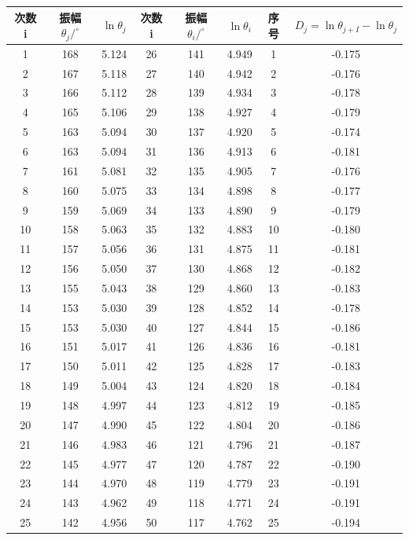 \documentclass[UTF8]{ctexart}
\begin{document}
\begin{center}
    \begin{tabular}{|c|c|c|c|c|c|c|c|}
        \hline   次数  i &  振幅  $\theta_{j} /^{\circ}$ & $\ln \theta_{j} $&  次数  i &  振幅  $\theta_{i} /^{\circ}$ & $\ln \theta_{i}$& 序号& $D_j=\ln \theta_{j+I}-\ln \theta_{j}$ \\
        \hline 1 & 168 & 5.124 & 26 & 141 & 4.949 &1     & -0.175  \\
        \hline 2 & 167 & 5.118 & 27 & 140 & 4.942 &2     & -0.176 \\
        \hline 3 & 166 & 5.112 & 28 & 139 & 4.934 &3     & -0.178 \\
        \hline 4 & 165 & 5.106 & 29 & 138 & 4.927 &4     & -0.179 \\
        \hline 5 & 163 & 5.094 & 30 & 137 & 4.920 &5     & -0.174 \\
        \hline 6 & 163 & 5.094 & 31 & 136 & 4.913 &6     & -0.181 \\
        \hline 7 & 161 & 5.081 & 32 & 135 & 4.905 &7     & -0.176 \\
        \hline 8 & 160 & 5.075 & 33 & 134 & 4.898 &8     & -0.177 \\
        \hline 9 & 159 & 5.069 & 34 & 133 & 4.890 &9     & -0.179 \\
        \hline 10 & 158 & 5.063 & 35 & 132 & 4.883 &10   & -0.180 \\
        \hline 11 & 157 & 5.056 & 36 & 131 & 4.875 &11   & -0.181 \\
        \hline 12 & 156 & 5.050 & 37 & 130 & 4.868 &12   & -0.182 \\
        \hline 13 & 155 & 5.043 & 38 & 129 & 4.860 &13   & -0.183 \\
        \hline 14 & 153 & 5.030 & 39 & 128 & 4.852 &14   & -0.178 \\
        \hline 15 & 153 & 5.030 & 40 & 127 & 4.844 &15   & -0.186\\
        \hline 16 & 151 & 5.017 & 41 & 126 & 4.836 &16   & -0.181\\
        \hline 17 & 150 & 5.011 & 42 & 125 & 4.828 &17   & -0.183 \\
        \hline 18 & 149 & 5.004 & 43 & 124 & 4.820 &18   & -0.184 \\
        \hline 19 & 148 & 4.997 & 44 & 123 & 4.812 &19   & -0.185\\
        \hline 20 & 147 & 4.990 & 45 & 122 & 4.804 &20   & -0.186 \\
        \hline 21 & 146 & 4.983 & 46 & 121 & 4.796 &21   & -0.187\\
        \hline 22 & 145 & 4.977 & 47 & 120 & 4.787 &22   & -0.190\\
        \hline 23 & 144 & 4.970 & 48 & 119 & 4.779 &23   & -0.191\\
        \hline 24 & 143 & 4.962 & 49 & 118 & 4.771 &24   & -0.191\\
        \hline 25 & 142 & 4.956 & 50 & 117 & 4.762 &25   & -0.194\\
        \hline
    \end{tabular}
\end{center}
\end{document}
